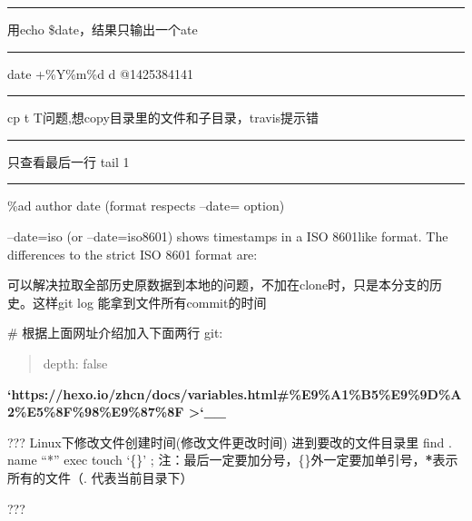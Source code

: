 \documentclass[letterpaper,12pt,english]{sphinxmanual}
\begin{document}
\bigskip\hrule\bigskip


用echo \$date，结果只输出一个ate


\bigskip\hrule\bigskip


date +\%Y\%m\%d \sphinxhyphen{}d @1425384141


\bigskip\hrule\bigskip


cp \sphinxhyphen{}t \sphinxhyphen{}T问题,想copy目录里的文件和子目录，travis提示错


\bigskip\hrule\bigskip


只查看最后一行
tail \sphinxhyphen{}1


\bigskip\hrule\bigskip


\%ad
author date (format respects –date= option)

–date=iso (or –date=iso8601) shows timestamps in a ISO 8601\sphinxhyphen{}like format. The differences to the strict ISO 8601 format are:

可以解决拉取全部历史原数据到本地的问题，不加在clone时，只是本分支的历史。这样git log 能拿到文件所有commit的时间

\# 根据上面网址介绍加入下面两行
git:
\begin{quote}

depth: false
\end{quote}

{\color{red}\bfseries{}`https://hexo.io/zh\sphinxhyphen{}cn/docs/variables.html\#\%E9\%A1\%B5\%E9\%9D\%A2\%E5\%8F\%98\%E9\%87\%8F
>`\_\_}

???
Linux下修改文件创建时间(修改文件更改时间)
进到要改的文件目录里
find . \sphinxhyphen{}name “*” \sphinxhyphen{}exec touch ‘\{\}’ ;
注：最后一定要加分号，\{\}外一定要加单引号，{\color{red}\bfseries{}*}表示所有的文件（. 代表当前目录下）

???





\end{document}

